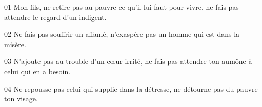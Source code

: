 01 Mon fils, ne retire pas au pauvre ce qu’il lui faut pour vivre, ne fais pas attendre le regard d’un indigent.

02 Ne fais pas souffrir un affamé, n’exaspère pas un homme qui est dans la misère.

03 N’ajoute pas au trouble d’un cœur irrité, ne fais pas attendre ton aumône à celui qui en a besoin.

04 Ne repousse pas celui qui supplie dans la détresse, ne détourne pas du pauvre ton visage.
